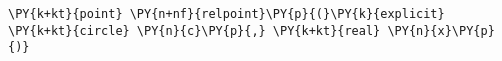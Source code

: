 \begin{Verbatim}[commandchars=\\\{\}]
    \PY{k+kt}{point} \PY{n+nf}{relpoint}\PY{p}{(}\PY{k}{explicit} \PY{k+kt}{circle} \PY{n}{c}\PY{p}{,} \PY{k+kt}{real} \PY{n}{x}\PY{p}{)}
\end{Verbatim}
